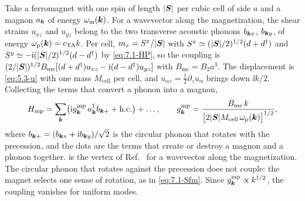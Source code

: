 Take a ferromagnet with one spin of length $|\bm{S}|$ per cubic cell of side $a$ and a magnon $a_{\bm{k}}$ of energy $\omega_{\mathrm{m}}(\bm{k})$. For a wavevector along the magnetization, the shear strains $u_{xz}$ and $u_{yz}$ belong to the two transverse acoustic phonons $b_{\bm{k}x}$, $b_{\bm{k}y}$, of energy $\omega_{\mathrm{p}}(\bm{k}) = c_{\mathrm{TA}}k$. Per cell, $m_x = S^x/|\bm{S}|$ with $S^x \simeq (|\bm{S}|/2)^{1/2}(d + d^\dagger)$ and $S^y \simeq -\mathrm{i}(|\bm{S}|/2)^{1/2}(d - d^\dagger)$ by \cref{eq:7.1-HP}, so the coupling is $(2/|\bm{S}|)^{1/2}B_{\mathrm{me}}[(d + d^\dagger)u_{xz} - \mathrm{i}(d - d^\dagger)u_{yz}]$ with $B_{\mathrm{me}} = B_2a^3$. The displacement is \cref{eq:5.3-u} with one mass $M_{\mathrm{cell}}$ per cell, and $u_{\alpha z} = \frac12\partial_zu_\alpha$ brings down $\ii k/2$. Collecting the terms that convert a phonon into a magnon,
\begin{equation}
  H_{\mathrm{mp}} = \sum_{\bm{k}}\bigl(\mathrm{i} g^{\mathrm{mp}}_{\bm{k}}\,a^\dagger_{\bm{k}}b_{\bm{k}+} + \text{h.c.}\bigr) + \dots , \qquad
  g^{\mathrm{mp}}_{\bm{k}} = \frac{B_{\mathrm{me}}\,k}{\bigl[2|\bm{S}|M_{\mathrm{cell}}\,\omega_{\mathrm{p}}(\bm{k})\bigr]^{1/2}} ,
  \label{eq:14.2-gmp}
\end{equation}
where $b_{\bm{k}+} = (b_{\bm{k}x} + \mathrm{i} b_{\bm{k}y})/\sqrt2$ is the circular phonon that rotates with the precession, and the dots are the terms that create or destroy a magnon and a phonon together.  is the vertex of Ref.~\cite[Eqs.~(3.23) and (3.25)]{ruckriegel2014magnetoelastic} for a wavevector along the magnetization. The circular phonon that rotates against the precession does not couple: the magnet selects one sense of rotation, as in \cref{eq:7.1-Sfm}. Since $g^{\mathrm{mp}}_{\bm{k}} \propto k^{1/2}$, the coupling vanishes for uniform modes.

